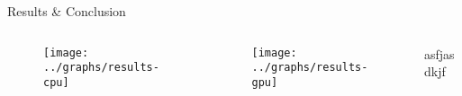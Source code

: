 \documentclass[final,t]{beamer}
\begin{document}
\begin{frame}[t,fragile]{}
\begin{columns}[t]
\begin{column}{.97\linewidth}
\begin{exampleblock}{Results \& Conclusion}
	\begin{columns}[t]
		\begin{column}{.32\linewidth}
		    \begin{figure}
		    	\texttt{[image: ../graphs/results-cpu]}
		    \end{figure}
		\end{column}
		\begin{column}{.32\linewidth}
		    \begin{figure}
		    	\texttt{[image: ../graphs/results-gpu]}
		    \end{figure}
		\end{column}		
		\begin{column}{.32\linewidth}
			asfjasdkjf
		\end{column}				
	\end{columns}


\end{exampleblock}
\end{column}
\end{columns}
\end{frame}
\end{document}
